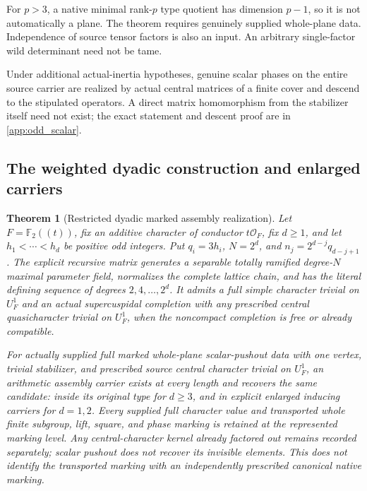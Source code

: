 \documentclass[11pt]{amsart}
\newtheorem{theorem}{Theorem}[section]
\theoremstyle{definition}
\theoremstyle{remark}
\newcommand{\FF}{\mathbb F}
\newcommand{\OO}{\mathcal O}
\begin{document}
For \(p>3\), a native minimal rank-\(p\) type quotient has dimension
\(p-1\), so it is not automatically a plane. The theorem requires
genuinely supplied whole-plane data. Independence of source tensor
factors is also an input. An arbitrary single-factor wild determinant
need not be tame.

Under additional actual-inertia hypotheses, genuine scalar phases on
the entire source carrier are realized by actual central matrices of a
finite cover and descend to the stipulated operators. A direct matrix
homomorphism from the stabilizer itself need not exist; the exact
statement and descent proof are in \cref{app:odd_scalar}.

\subsection{The weighted dyadic construction and enlarged carriers}

\begin{theorem}[Restricted dyadic marked assembly realization]
\label{thm:dyadic_arithmetic}
Let \(F=\FF_2((t))\), fix an additive character of conductor
\(t\OO_F\), fix \(d\ge1\), and let \(h_1<\cdots<h_d\) be positive odd integers.
Put \(q_i=3h_i\), \(N=2^d\), and
\(n_j=2^{d-j}q_{d-j+1}\). The explicit recursive matrix generates a
separable totally ramified degree-\(N\) maximal parameter field,
normalizes the complete lattice chain, and has the literal defining
sequence of degrees \(2,4,\ldots,2^d\). It admits a full simple character
trivial on \(U_F^1\) and an actual supercuspidal completion with any
prescribed central quasicharacter trivial on \(U_F^1\), when the
noncompact completion is free or already compatible.

For actually supplied full marked whole-plane scalar-pushout data with
one vertex, trivial stabilizer, and prescribed source central character
trivial on \(U_F^1\), an arithmetic assembly carrier exists
at every length and recovers the same candidate: inside its original
type for \(d\ge3\), and in explicit enlarged inducing carriers for
\(d=1,2\). Every supplied full character value and transported whole
finite subgroup, lift, square, and phase marking is retained at the
represented marking level. Any central-character kernel already factored
out remains recorded separately; scalar pushout does not recover its
invisible elements. This does
not identify the transported marking with an independently prescribed
canonical native marking.
\end{theorem}
\end{document}
